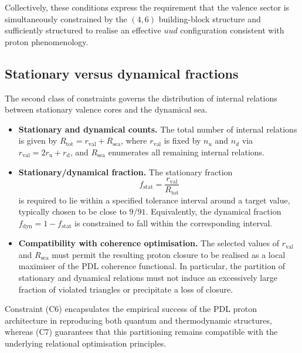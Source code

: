 \documentclass[11pt,a4paper]{article}
\theoremstyle{definition}
\begin{document}
Collectively, these conditions express the requirement that the valence sector is simultaneously constrained by the $(4,6)$ building-block structure and sufficiently structured to realise an effective $uud$ configuration consistent with proton phenomenology.

\subsection{Stationary versus dynamical fractions}

The second class of constraints governs the distribution of internal relations between stationary valence cores and the dynamical sea.

\begin{itemize}
  \item[(C5)] \textbf{Stationary and dynamical counts.} The total number of internal relations is given by $R_{\mathrm{tot}} = r_{\mathrm{val}} + R_{\mathrm{sea}}$, where $r_{\mathrm{val}}$ is fixed by $n_u$ and $n_d$ via $r_{\mathrm{val}} = 2r_{\mathrm{u}} + r_{\mathrm{d}}$, and $R_{\mathrm{sea}}$ enumerates all remaining internal relations.\cite{Combinatorial_Proton_v2_2026}
  \item[(C6)] \textbf{Stationary/dynamical fraction.} The stationary fraction
  \[
   f_{\mathrm{stat}} = \frac{r_{\mathrm{val}}}{R_{\mathrm{tot}}}
  \]
  is required to lie within a specified tolerance interval around a target value, typically chosen to be close to $9/91$. Equivalently, the dynamical fraction $f_{\mathrm{dyn}} = 1 - f_{\mathrm{stat}}$ is constrained to fall within the corresponding interval.\cite{Combinatorial_Proton_v2_2026,PDL_Global_Mapping_2026}
  \item[(C7)] \textbf{Compatibility with coherence optimisation.} The selected values of $r_{\mathrm{val}}$ and $R_{\mathrm{sea}}$ must permit the resulting proton closure to be realised as a local maximiser of the PDL coherence functional. In particular, the partition of stationary and dynamical relations must not induce an excessively large fraction of violated triangles or precipitate a loss of closure.\cite{PDL_Main_2026,PDL_Global_Mapping_2026}
\end{itemize}

Constraint (C6) encapsulates the empirical success of the PDL proton architecture in reproducing both quantum and thermodynamic structures, whereas (C7) guarantees that this partitioning remains compatible with the underlying relational optimisation principles.
\end{document}
